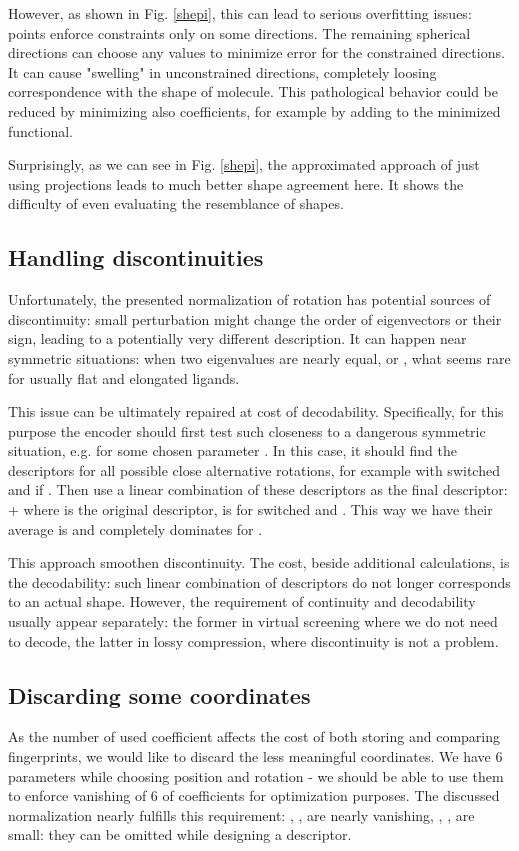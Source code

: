 \documentclass[10pt,journal]{IEEEtranTCOM}
\theoremstyle{plain}
\begin{document}
However, as shown in Fig. \ref{shepi}, this can lead to serious overfitting issues: points enforce constraints only on some  directions. The remaining spherical directions can choose any values to minimize error for the constrained directions. It can cause "swelling" in unconstrained directions, completely loosing correspondence with the shape of molecule. This pathological behavior could be reduced by minimizing also coefficients, for example by adding  to the minimized functional.

Surprisingly, as we can see in Fig. \ref{shepi}, the approximated approach of just using projections leads to much better shape agreement here. It shows the difficulty of even evaluating the resemblance of shapes.
\subsection{Handling discontinuities}
Unfortunately, the presented normalization of rotation has potential sources of discontinuity: small perturbation might change the order of eigenvectors or their sign, leading to a potentially very different description. It can happen near symmetric situations: when two eigenvalues are nearly equal, or , what seems rare for usually flat and elongated ligands.

This issue can be ultimately repaired at cost of decodability. Specifically, for this purpose the encoder should first test such closeness to a dangerous symmetric situation, e.g.  for some chosen parameter . In this case, it should find the descriptors for all possible close alternative rotations, for example with switched  and  if . Then use a linear combination of these descriptors as the final descriptor:
\be {}+  \ee
where  is the original descriptor,  is for switched  and . This way we have their average is  and  completely dominates for .

This approach smoothen discontinuity. The cost, beside additional calculations, is the decodability: such linear combination of descriptors do not longer corresponds to an actual shape. However, the requirement of continuity and decodability usually appear separately: the former in virtual screening where we do not need to decode, the latter in lossy compression, where discontinuity is not a problem.
\subsection{Discarding some coordinates}
As the number of used coefficient affects the cost of both storing and comparing fingerprints, we would like to discard the less meaningful coordinates. We have 6 parameters while choosing position and rotation - we should be able to use them to enforce vanishing of 6 of  coefficients for optimization purposes. The discussed normalization nearly fulfills this requirement:  , ,  are nearly vanishing, , ,  are small: they can be omitted while designing a descriptor.
\end{document}
